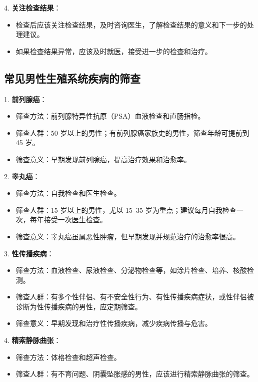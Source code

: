 \documentclass[12pt,a4paper,twoside]{ctexbook}
\begin{document}
4. \textbf{关注检查结果}：
  \begin{itemize}
  \item 检查后应该关注检查结果，及时咨询医生，了解检查结果的意义和下一步的处理建议。
  \item 如果检查结果异常，应该及时就医，接受进一步的检查和治疗。
  \end{itemize}

\subsection{常见男性生殖系统疾病的筛查}

1. \textbf{前列腺癌}：
  \begin{itemize}
  \item 筛查方法：前列腺特异性抗原（PSA）血液检查和直肠指检。
  \item 筛查人群：50 岁以上的男性；有前列腺癌家族史的男性，筛查年龄可提前到 45 岁。
  \item 筛查意义：早期发现前列腺癌，提高治疗效果和治愈率。
  \end{itemize}

2. \textbf{睾丸癌}：
  \begin{itemize}
  \item 筛查方法：自我检查和医生检查。
  \item 筛查人群：15 岁以上的男性，尤以 15--35 岁为重点；建议每月自我检查一次，每年接受一次医生检查。
  \item 筛查意义：睾丸癌虽属恶性肿瘤，但早期发现并规范治疗的治愈率很高。
  \end{itemize}

3. \textbf{性传播疾病}：
  \begin{itemize}
  \item 筛查方法：血液检查、尿液检查、分泌物检查等，如涂片检查、培养、核酸检测。
  \item 筛查人群：有多个性伴侣、有不安全性行为、有性传播疾病症状，或性伴侣被诊断为性传播疾病的男性，应定期筛查。
  \item 筛查意义：早期发现和治疗性传播疾病，减少疾病传播与危害。
  \end{itemize}

4. \textbf{精索静脉曲张}：
  \begin{itemize}
  \item 筛查方法：体格检查和超声检查。
  \item 筛查人群：有不育问题、阴囊坠胀感的男性，应该进行精索静脉曲张的筛查。
  \end{itemize}
\end{document}

